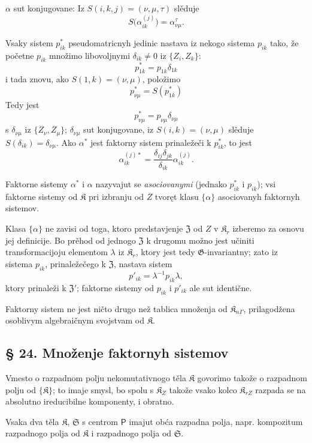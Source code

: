 \documentclass[11pt]{article}
\begin{document}
\(\alpha\) sut konjugovane: Iz \(S(i,k,j)=(\nu,\mu,\tau)\) slěduje
\[
S\bigl(\alpha_{ik}^{(j)}\bigr)=\alpha_{\nu\mu}^{\tau}.
\]

Vsaky sistem \(p_{ik}^*\) pseudomatricnyh jedinic nastava iz nekogo sistema \(p_{ik}\) tako, že početne \(p_{ik}\) množimo libovoljnymi \(\delta_{ik}\ne0\) iz \(\{Z_i,Z_k\}\):
\[
p_{1k}^*=p_{1k}\delta_{1k}
\]
i tada znovu, ako \(S(1,k)=(\nu,\mu)\), položimo
\[
p_{\nu\mu}^*=S(p_{1k}^*)
\]
Tedy jest
\[
p_{\nu\mu}^*=p_{\nu\mu}\delta_{\nu\mu}
\]
s \(\delta_{\nu\mu}\) iz \(\{Z_\nu,Z_\mu\}\); \(\delta_{\nu\mu}\) sut konjugovane, iz \(S(i,k)=(\nu,\mu)\) slěduje \(S(\delta_{ik})=\delta_{\nu\mu}\). Ako \(\alpha^*\) jest faktorny sistem prinaležeči k \(p_{ik}^*\), to jest
\[
\alpha_{ik}^{(j)*}=\frac{\delta_{ij}\delta_{jk}}{\delta_{ik}}\alpha_{ik}^{(j)}.
\]

Faktorne sistemy \(\alpha^*\) i \(\alpha\) nazyvajut se \emph{asociovanymi} (jednako \(p_{ik}^*\) i \(p_{ik}\)); vsi faktorne sistemy od \(\mathfrak K\) pri izbranju od \(Z\) tvoręt klasu \(\{\alpha\}\) asociovanyh faktornyh sistemov.

Klasa \(\{\alpha\}\) ne zavisi od toga, ktoro predstavjenje \(\mathfrak Z\) od \(Z\) v \(\mathfrak K_r\) izberemo za osnovu jej definicije. Bo prěhod od jednogo \(\mathfrak Z\) k drugomu možno jest učiniti transformacijoju elementom \(\lambda\) iz \(\mathfrak K_r\), ktory jest tedy \(\mathfrak G\)-invariantny; zato iz sistema \(p_{ik}\), prinaležečego k \(\mathfrak Z\), nastava sistem
\[
p'_{ik}=\lambda^{-1}p_{ik}\lambda,
\]
ktory prinaleži k \(\mathfrak Z'\); faktorne sistemy od \(p_{ik}\) i \(p'_{ik}\) ale sut identične.

Faktorny sistem ne jest ničto drugo než tablica množenja od \(\mathfrak K_{n\Gamma}\), prilagodžena osoblivym algebraičnym svojstvam od \(\mathfrak K\).

\subsection*{§ 24. Množenje faktornyh sistemov}\label{multiplikation-von-faktorensystemen}

Vmesto o razpadnom polju nekomutativnogo těla \(\mathfrak K\) govorimo takože o razpadnom polju od \(\{\mathfrak K\}\); to imaje smysl, bo spolu s \(\mathfrak K_Z\) takože vsako kolco \(\mathfrak K_{rZ}\) razpada se na absolutno ireducibilne komponenty, i obratno.

Vsaka dva těla \(\mathfrak K\), \(\mathfrak S\) s centrom \(\mathsf P\) imajut obća razpadna polja, napr. kompozitum razpadnogo polja od \(\mathfrak K\) i razpadnogo polja od \(\mathfrak S\).
\end{document}
